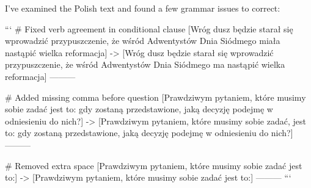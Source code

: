 I've examined the Polish text and found a few grammar issues to correct:

```
# Fixed verb agreement in conditional clause
[Wróg dusz będzie starał się wprowadzić przypuszczenie, że wśród Adwentystów Dnia Siódmego miała nastąpić wielka reformacja]
->
[Wróg dusz będzie starał się wprowadzić przypuszczenie, że wśród Adwentystów Dnia Siódmego ma nastąpić wielka reformacja]
---------

# Added missing comma before question
[Prawdziwym pytaniem, które musimy sobie zadać  jest to: gdy  zostaną przedstawione, jaką decyzję podejmę w odniesieniu do nich?]
->
[Prawdziwym pytaniem, które musimy sobie zadać, jest to: gdy  zostaną przedstawione, jaką decyzję podejmę w odniesieniu do nich?]
---------

# Removed extra space
[Prawdziwym pytaniem, które musimy sobie zadać  jest to:]
->
[Prawdziwym pytaniem, które musimy sobie zadać jest to:]
---------
```